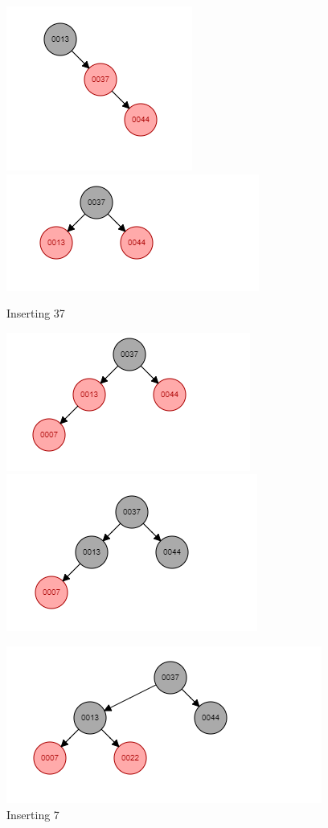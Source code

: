 \documentclass[a4paper,12pt]{article}
\begin{document}
{{\begin{figure}[h!]
\includegraphics{1a3_2.png}
\includegraphics{1a3_3.png}
\caption {Inserting 37}
\end{figure}
\newpage
\begin{figure} [h!]
\includegraphics{1a4_1.png}
\includegraphics{1a4_2.png}
\caption{Inserting 7}
\includegraphics{1a5_1.png}

\end{figure}}}
\end{document}

